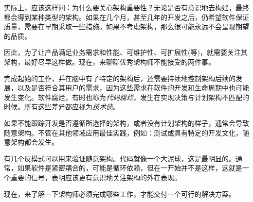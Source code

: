 
实际上，应该这样问：为什么要关心架构重要性？无论是否有意识地去构建，最终都会得到某种类型的架构。如果在几个月，甚至几年的开发之后，仍希望软件保证质量，需要在早期采取一些措施。如果不考虑架构，那么很可能永远不会呈现期望的品质。

因此，为了让产品满足业务需求和性能、可维护性、可扩展性(等)，就需要关注其架构，最好尽早这样做。现在，来聊聊优秀架构师不能接受的两件事。


完成起始的工作，并在脑中有了特定的架构后，还需要持续地控制架构后续的发展，以及是否符合其用户的需求，因为这些需求在软件的开发和生命周期中也可能发生变化。软件腐烂，有时也称为\textit{代码腐烂}，发生在实现决策与计划架构不匹配的时候。所有这些差异都应视为\textit{技术债}。


如果不能跟踪开发是否遵循所选择的架构，或者没有计划架构的样子，通常会导致随意架构。不管在其他领域应用最佳实践，例如：测试或具有特定的开发文化，随意架构都会发生。

有几个反模式可以用来验证随意架构。代码就像一个大泥球，这是最明显的。通常，如果软件是紧密耦合的，可能是循环依赖，但在一开始并不是这样，这就是一个重要的信号，表明应该更有意识地关注架构的外在表现。

现在，来了解一下架构师必须完成哪些工作，才能交付一个可行的解决方案。









